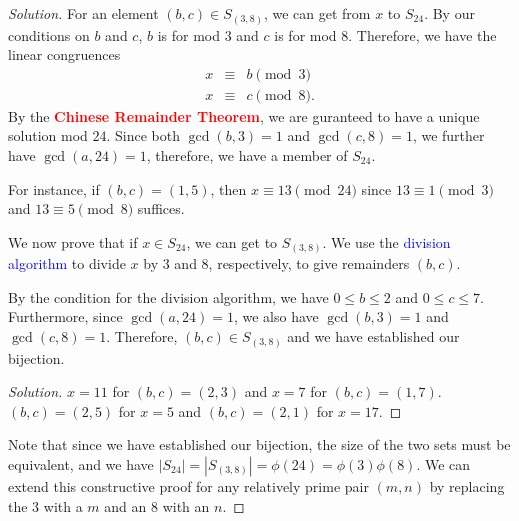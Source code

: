 \begin{proof}[Solution]
For an element $(b,c) \in S_{(3,8)}$, we can get from $x$ to $S_{24}$. By our conditions on $b$ and $c$, $b$ is for mod $3$ and $c$ is for mod $8$. Therefore, we have the linear congruences \begin{eqnarray*} x &\equiv& b\pmod{3} \\ x &\equiv& c\pmod{8}. \end{eqnarray*}
By the \textbf{\textcolor{red}{Chinese Remainder Theorem}}, we are guranteed to have a unique solution mod $24$. Since both $\gcd(b, 3)=1$ and $\gcd(c, 8)=1$, we further have $\gcd(a, 24)=1$, therefore, we have a member of $S_{24}$. 

For instance, if $(b,c)=(1, 5)$, then $x\equiv 13\pmod{24}$ since $13\equiv 1\pmod{3}$ and $13\equiv 5\pmod{8}$ suffices. 


\vspace{5pt}
We now prove that if $x\in S_{24}$, we can get to $S_{(3,8)}$. We use the \textcolor{blue}{division algorithm} to divide $x$ by $3$ and $8$, respectively, to give remainders $(b, c)$. 

By the condition for the division algorithm, we have $0\le b\le 2$ and $0\le c\le 7$. Furthermore, since $\gcd(a, 24)=1$, we also have $\gcd(b, 3)=1$ and $\gcd(c, 8)=1$. Therefore, $(b,c)\in S_{(3,8)}$ and we have established our bijection.

\clearpage

\begin{proof}[Solution] $x=11$ for $(b,c)=(2,3)$ and $x=7$ for $(b,c)=(1,7)$. \\
						$(b,c)=(2, 5)$ for $x=5$ and $(b,c)=(2, 1)$ for $x=17$. \end{proof}
Note that since we have established our bijection, the size of the two sets must be equivalent, and we have $|S_{24}|=|S_{(3,8)}|=\phi(24)=\phi(3)\phi(8).$  We can extend this constructive proof for any relatively prime pair $(m,n)$ by replacing the $3$ with a $m$ and an $8$ with an $n$. 
\end{proof}

